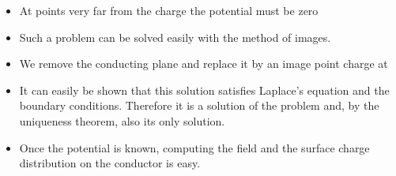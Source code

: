 \begin{ELunit}

\begin{itemize}
\tightlist
\item
  At points very far from the charge  the potential must be zero
\end{itemize}


\begin{itemize}
\tightlist
\item
  Such a problem can be solved easily with the method of images.
\end{itemize}

\end{ELunit}

\ELhold


\begin{ELunit}

\begin{itemize}
\tightlist
\item
  We remove the conducting plane and replace it by an image point charge  at 
\end{itemize}


\end{ELunit}

\begin{ELimportant}{}


\end{ELimportant}

\begin{ELunit}

\begin{itemize}
\tightlist
\item
  It can easily be shown that this solution satisfies Laplace's equation and the boundary conditions. Therefore it is a solution of the problem and, by the uniqueness theorem, also its only solution.
\item
  Once the potential is known, computing the field and the surface charge distribution on the conductor is easy.
\end{itemize}

\end{ELunit}

